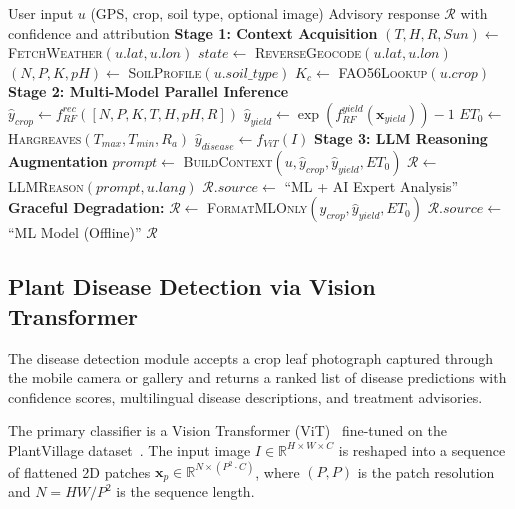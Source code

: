 \documentclass[conference]{IEEEtran}
\begin{document}
\begin{algorithm}[t]
\caption{HARVEST Framework: Hybrid Agri-intelligence with Real-time Verification, ET\textsubscript{0} Scheduling, and Transformer-based Diagnostics}
\label{alg:harvest}
\begin{algorithmic}[1]
\renewcommand{\algorithmicrequire}{\textbf{Input:}}
\renewcommand{\algorithmicensure}{\textbf{Output:}}
\REQUIRE User input $u$ (GPS, crop, soil type, optional image)
\ENSURE Advisory response $\mathcal{R}$ with confidence and attribution
\STATE \textbf{Stage 1: Context Acquisition}
\STATE $(T, H, R, Sun) \gets$ \textsc{FetchWeather}$(u.lat, u.lon)$
\STATE $state \gets$ \textsc{ReverseGeocode}$(u.lat, u.lon)$
\STATE $(N, P, K, pH) \gets$ \textsc{SoilProfile}$(u.soil\_type)$
\STATE $K_c \gets$ \textsc{FAO56Lookup}$(u.crop)$
\STATE \textbf{Stage 2: Multi-Model Parallel Inference}
\STATE $\hat{y}_{crop} \gets f_{RF}^{rec}([N,P,K,T,H,pH,R])$
\STATE $\hat{y}_{yield} \gets \exp(f_{RF}^{yield}(\mathbf{x}_{yield})) - 1$
\STATE $ET_0 \gets$ \textsc{Hargreaves}$(T_{max}, T_{min}, R_a)$
    \STATE $\hat{y}_{disease} \gets f_{ViT}(I)$
\ENDIF
\STATE \textbf{Stage 3: LLM Reasoning Augmentation}
    \STATE $prompt \gets$ \textsc{BuildContext}$(u, \hat{y}_{crop}, \hat{y}_{yield}, ET_0)$
    \STATE $\mathcal{R} \gets$ \textsc{LLMReason}$(prompt, u.lang)$
    \STATE $\mathcal{R}.source \gets$ ``ML + AI Expert Analysis''
\ELSE
    \STATE \textbf{Graceful Degradation:}
    \STATE $\mathcal{R} \gets$ \textsc{FormatMLOnly}$(\hat{y}_{crop}, \hat{y}_{yield}, ET_0)$
    \STATE $\mathcal{R}.source \gets$ ``ML Model (Offline)''
\ENDIF
\RETURN $\mathcal{R}$
\end{algorithmic}
\end{algorithm}

\subsection{Plant Disease Detection via Vision Transformer}

The disease detection module accepts a crop leaf photograph captured through the mobile camera or gallery and returns a ranked list of disease predictions with confidence scores, multilingual disease descriptions, and treatment advisories.

The primary classifier is a Vision Transformer (ViT)~\cite{b24} fine-tuned on the PlantVillage dataset~\cite{b27}. The input image $I \in \mathbb{R}^{H \times W \times C}$ is reshaped into a sequence of flattened 2D patches $\mathbf{x}_p \in \mathbb{R}^{N \times (P^2 \cdot C)}$, where $(P, P)$ is the patch resolution and $N = HW/P^2$ is the sequence length.
\end{document}
